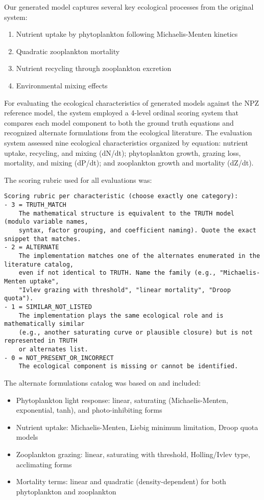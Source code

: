 Our generated model captures several key ecological processes from the original system:
\begin{enumerate}
\item Nutrient uptake by phytoplankton following Michaelis-Menten kinetics
\item Quadratic zooplankton mortality
\item Nutrient recycling through zooplankton excretion
\item Environmental mixing effects
\end{enumerate}

For evaluating the ecological characteristics of generated models against the NPZ reference model, the system employed a 4-level ordinal scoring system that compares each model component to both the ground truth equations and recognized alternate formulations from the ecological literature. The evaluation system assessed nine ecological characteristics organized by equation: nutrient uptake, recycling, and mixing (dN/dt); phytoplankton growth, grazing loss, mortality, and mixing (dP/dt); and zooplankton growth and mortality (dZ/dt).

The scoring rubric used for all evaluations was:

\begin{lstlisting}
Scoring rubric per characteristic (choose exactly one category):
- 3 = TRUTH_MATCH
    The mathematical structure is equivalent to the TRUTH model (modulo variable names,
    syntax, factor grouping, and coefficient naming). Quote the exact snippet that matches.
- 2 = ALTERNATE
    The implementation matches one of the alternates enumerated in the literature catalog,
    even if not identical to TRUTH. Name the family (e.g., "Michaelis-Menten uptake",
    "Ivlev grazing with threshold", "linear mortality", "Droop quota").
- 1 = SIMILAR_NOT_LISTED
    The implementation plays the same ecological role and is mathematically similar
    (e.g., another saturating curve or plausible closure) but is not represented in TRUTH
    or alternates list.
- 0 = NOT_PRESENT_OR_INCORRECT
    The ecological component is missing or cannot be identified.
\end{lstlisting}

The alternate formulations catalog was based on \cite{franks2002npz} and included:

\begin{itemize}
    \item Phytoplankton light response: linear, saturating (Michaelis-Menten, exponential, tanh), and photo-inhibiting forms
    \item Nutrient uptake: Michaelis-Menten, Liebig minimum limitation, Droop quota models
    \item Zooplankton grazing: linear, saturating with threshold, Holling/Ivlev type, acclimating forms
    \item Mortality terms: linear and quadratic (density-dependent) for both phytoplankton and zooplankton
\end{itemize}

